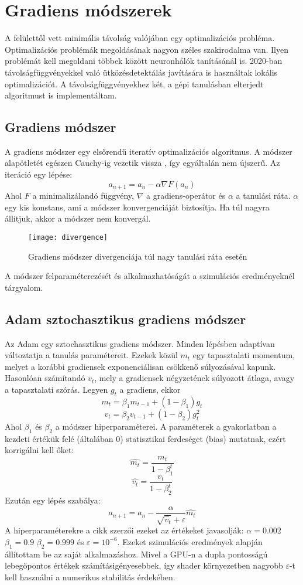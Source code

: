 \section{Gradiens módszerek}

A felülettől vett minimális távolság valójában egy optimalizációs probléma. Optimalizációs problémák megoldásának nagyon széles szakirodalma van. Ilyen problémát kell megoldani többek között neuronhálók tanításánál is. 2020-ban távolságfüggvényekkel való ütközésdetektálás javítására is használtak lokális optimalizációt. \cite{locOptSDFCollision} A távolságfüggvényekhez két, a gépi tanulásban elterjedt algoritmust is implementáltam.

\subsection{Gradiens módszer}
A gradiens módszer egy elsőrendű iteratív optimalizációs algoritmus. A módszer alapötletét egészen Cauchy-ig vezetik vissza \cite{LemarechalOnGrad}, így egyáltalán nem újszerű. Az iteráció egy lépése:
$$ a_{n+1} = a_n - \alpha\nabla F(a_n) $$
Ahol $F$ a minimalizálandó függvény, $\nabla$ a gradiens-operátor és $\alpha$ a tanulási ráta. $\alpha$ egy kis konstans, ami a módszer konvergenciáját biztosítja. Ha túl nagyra állítjuk, akkor a módszer nem konvergál. 
\begin{figure}[H]
	\centering
	\texttt{[image: divergence]}
	\caption{Gradiens módszer divergenciája túl nagy tanulási ráta esetén}
\end{figure}
A módszer felparaméterezését és alkalmazhatóságát a szimulációs eredményeknél tárgyalom.

\subsection{Adam sztochasztikus gradiens módszer}
Az Adam \cite{Adam} egy sztochasztikus gradiens módszer. Minden lépésben adaptívan változtatja a tanulás paramétereit. Ezekek közül $m_t$ egy tapasztalati momentum, melyet a korábbi gradiensek exponenciálisan csökkenő súlyozásával kapunk. Hasonlóan számítandó $v_t$, mely a gradiensek négyzetének súlyozott átlaga, avagy a tapasztalati szórás. Legyen $g_t$ a gradiens, ekkor
$$ m_t = \beta_1 m_{t-1} + (1-\beta_1)g_t $$
$$ v_t = \beta_2 v_{t-1} + (1-\beta_2)g^2_t $$
Ahol $\beta_1$ és $\beta_2$ a módszer hiperparaméterei. A paraméterek a gyakorlatban a kezdeti értékük felé (általában 0) statisztikai ferdeséget (bias) mutatnak, ezért korrigálni kell őket:
$$ \hat{m_t} = \frac{m_t}{1-\beta_1^t} $$
$$ \hat{v_t} = \frac{v_t}{1-\beta_2^t} $$
Ezután egy lépés szabálya:
$$ a_{n+1} = a_n - \frac{\alpha}{\sqrt{\hat{v_t}}+\varepsilon}\hat{m_t} $$
A hiperparaméterekre a cikk szerzői ezeket az értékeket javasolják: $\alpha=0.002$ $\beta_1=0.9$ $\beta_2=0.999$ és $\varepsilon=10^{-6}$. Ezeket szimulációs eredmények alapján állítottam be az saját alkalmazáshoz. Mivel a GPU-n a dupla pontosságú lebegőpontos értékek számításigényesebbek, így shader környezetben nagyobb $\varepsilon$-t kell használni a numerikus stabilitás érdekében.


